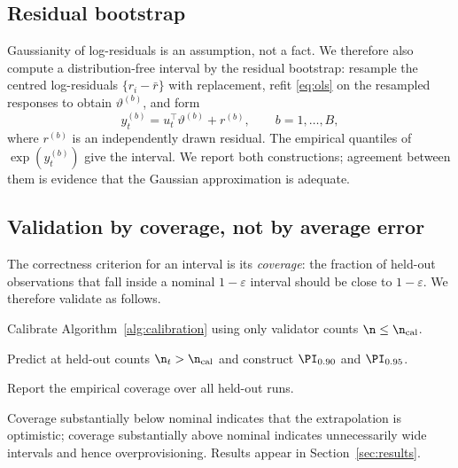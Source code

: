 \subsection{Residual bootstrap}

Gaussianity of log-residuals is an assumption, not a fact. We therefore also
compute a distribution-free interval by the residual bootstrap: resample the
centred log-residuals $\{r_{i}-\bar r\}$ with replacement, refit
\eqref{eq:ols} on the resampled responses to obtain $\vartheta^{(b)}$,
and form
\begin{equation}
y_{t}^{(b)}=u_{t}^{\!\top}\vartheta^{(b)}+r^{(b)},\qquad b=1,\dots,B,
\label{eq:bootstrap}
\end{equation}
where $r^{(b)}$ is an independently drawn residual. The empirical quantiles of
$\exp(y_{t}^{(b)})$ give the interval. We report both constructions; agreement
between them is evidence that the Gaussian approximation is adequate.

\subsection{Validation by coverage, not by average error}

The correctness criterion for an interval is its \emph{coverage}: the fraction
of held-out observations that fall inside a nominal $1-\varepsilon$ interval
should be close to $1-\varepsilon$. We therefore validate as follows.

\begin{enumerate*}
\item Calibrate Algorithm~\ref{alg:calibration} using only validator counts
$\n\le\n_{\mathrm{cal}}$.
\item Predict at held-out counts $\n_{t}>\n_{\mathrm{cal}}$ and construct
$\PI_{0.90}$ and $\PI_{0.95}$.
\item Report the empirical coverage over all held-out runs.
\end{enumerate*}

Coverage substantially below nominal indicates that the extrapolation is
optimistic; coverage substantially above nominal indicates unnecessarily wide
intervals and hence overprovisioning. Results appear in
Section~\ref{sec:results}.
